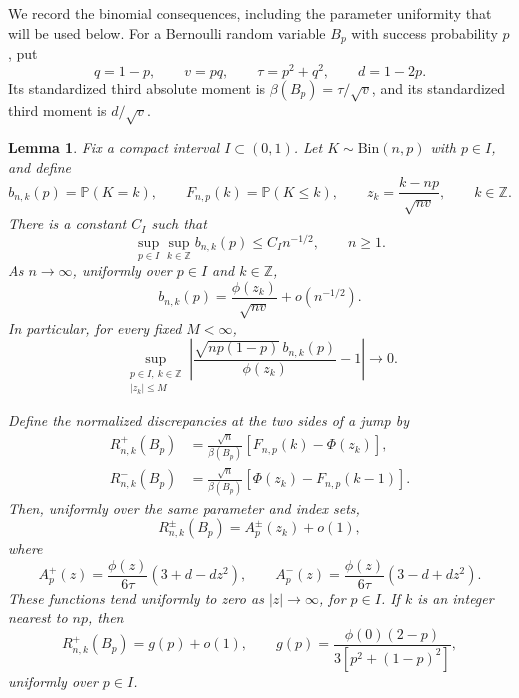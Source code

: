 \documentclass[aop]{imsart}
\theoremstyle{plain}
\newtheorem{lemma}[theorem]{Lemma}
\theoremstyle{definition}
\theoremstyle{definition}
\newcommand{\PP}{\mathbb P}
\begin{document}
We record the binomial consequences, including the parameter uniformity
that will be used below.  For a Bernoulli random variable \(B_p\) with
success probability \(p\), put
\[
 q=1-p,\qquad v=pq,\qquad \tau=p^2+q^2,\qquad d=1-2p.
\]
Its standardized third absolute moment is
\(\beta(B_p)=\tau/\sqrt v\), and its standardized third moment is
\(d/\sqrt v\).

\begin{lemma}\label{lem:binomial-estimates}
Fix a compact interval \(I\subset(0,1)\).  Let \(K\sim\mathrm{Bin}(n,p)\)
with \(p\in I\), and define
\[
 b_{n,k}(p)=\PP(K=k),\qquad F_{n,p}(k)=\PP(K\le k),\qquad
 z_k=\frac{k-np}{\sqrt{nv}},\qquad k\in\mathbb Z.
\]
There is a constant \(C_I\) such that
\begin{equation}\label{eq:binomial-mass-bound}
 \sup_{p\in I}\sup_{k\in\mathbb Z}b_{n,k}(p)
 \le C_I n^{-1/2},\qquad n\ge1.
\end{equation}
As \(n\to\infty\), uniformly over \(p\in I\) and \(k\in\mathbb Z\),
\begin{equation}\label{eq:binomial-local}
 b_{n,k}(p)=\frac{\phi(z_k)}{\sqrt{nv}}+o(n^{-1/2}).
\end{equation}
In particular, for every fixed \(M<\infty\),
\[
 \sup_{\substack{p\in I,\ k\in\mathbb Z\\ |z_k|\le M}}
 \left|
 \frac{\sqrt{np(1-p)}\,b_{n,k}(p)}{\phi(z_k)}-1
 \right|\longrightarrow0.
\]

Define the normalized discrepancies at the two sides of a jump by
\[
 \begin{split}
 R^+_{n,k}(B_p)
 &=\frac{\sqrt n}{\beta(B_p)}
        [F_{n,p}(k)-\Phi(z_k)],\\
 R^-_{n,k}(B_p)
 &=\frac{\sqrt n}{\beta(B_p)}
        [\Phi(z_k)-F_{n,p}(k-1)].
 \end{split}
\]
Then, uniformly over the same parameter and index sets,
\begin{equation}\label{eq:binomial-envelopes}
 R^\pm_{n,k}(B_p)=A_p^\pm(z_k)+o(1),
\end{equation}
where
\[
 A_p^+(z)=\frac{\phi(z)}{6\tau}(3+d-dz^2),\qquad
 A_p^-(z)=\frac{\phi(z)}{6\tau}(3-d+dz^2).
\]
These functions tend uniformly to zero as \(|z|\to\infty\), for
\(p\in I\).  If \(k\) is an integer nearest to \(np\), then
\begin{equation}\label{eq:binomial-central-branch}
 R^+_{n,k}(B_p)=g(p)+o(1),\qquad
 g(p)=\frac{\phi(0)(2-p)}{3[p^2+(1-p)^2]},
\end{equation}
uniformly over \(p\in I\).
\end{lemma}
\end{document}
